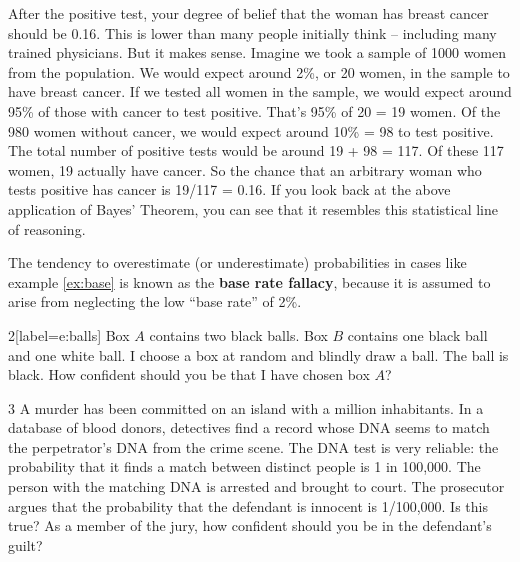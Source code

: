 After the positive test, your degree of belief that the woman has breast cancer
should be 0.16. This is lower than many people initially think -- including many
trained physicians. But it makes sense. Imagine we took a sample of 1000 women
from the population. We would expect around 2\%, or 20 women, in the sample to
have breast cancer. If we tested all women in the sample, we would expect around
95\% of those with cancer to test positive. That's 95\% of 20 = 19 women. Of the
980 women without cancer, we would expect around 10\% = 98 to test positive. The
total number of positive tests would be around 19 + 98 = 117. Of these 117 women, 19
actually have cancer. So the chance that an arbitrary woman who tests positive
has cancer is 19/117 = 0.16. If you look back at the above application of Bayes'
Theorem, you can see that it resembles this statistical line of reasoning.

The tendency to overestimate (or underestimate) probabilities in cases like
example \ref{ex:base} is known as the \textbf{base rate fallacy}, because it is
assumed to arise from neglecting the low ``base rate'' of 2\%.

\begin{exercise}{2}[label=e:balls]
  Box $A$ contains two black balls. Box $B$ contains one black ball and one
  white ball. I choose a box at random and blindly draw a ball. The ball is
  black. How confident should you be that I have chosen box $A$?
\end{exercise}

\begin{exercise}{3}\label{ex-prosecutor}
  A murder has been committed on an island with a million inhabitants. In a
  database of blood donors, detectives find a record whose DNA seems to match
  the perpetrator's DNA from the crime scene. The DNA test is very reliable: the
  probability that it finds a match between distinct people is 1 in 100,000. The
  person with the matching DNA is arrested and brought to court. The prosecutor
  argues that the probability that the defendant is innocent is 1/100,000. Is
  this true? As a member of the jury, how confident should you be in the
  defendant's guilt?
\end{exercise}

